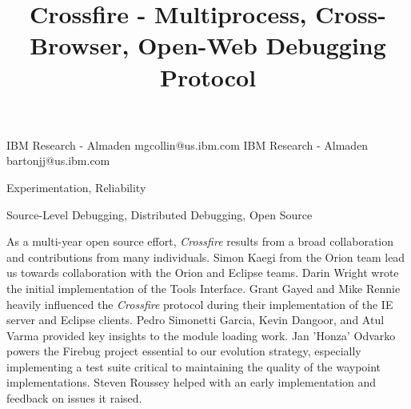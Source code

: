 \documentclass[preprint, 10pt]{sigplanconf}
\begin{document}
\copyrightdata{[to be supplied]}


\title{Crossfire - Multiprocess, Cross-Browser, Open-Web Debugging Protocol}


           {IBM Research - Almaden}
           {mgcollin@us.ibm.com}
           {IBM Research - Almaden}
           {bartonjj@us.ibm.com}

\maketitle





\terms
Experimentation, Reliability

\keywords
Source-Level Debugging, Distributed Debugging, Open Source



%







\acks
As a multi-year open source effort, \textit{Crossfire} results from a broad collaboration and 
contributions from many individuals. Simon Kaegi from the Orion team lead us towards collaboration with the Orion and Eclipse teams. Darin Wright wrote the initial implementation of the Tools Interface. Grant Gayed and Mike Rennie heavily influenced the \textit{Crossfire} protocol during their implementation of the IE server and Eclipse clients. Pedro Simonetti Garcia, Kevin Dangoor, and Atul Varma provided key insights to the module loading work. Jan 'Honza' Odvarko powers the Firebug project essential to our evolution strategy, especially implementing a test suite critical to maintaining the quality of the waypoint implementations. Steven Roussey helped with an early implementation and feedback on issues it raised.







%

\end{document}
